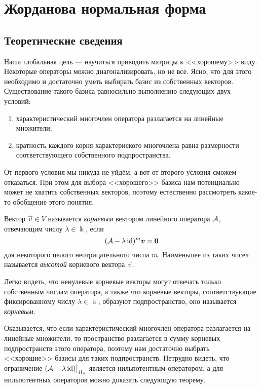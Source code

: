 \section{Жорданова нормальная форма}

\subsection{Теоретические сведения}

Наша глобальная цель --- научиться приводить матрицы к <<хорошему>> виду. Некоторые операторы можно диагонализировать, но не все. Ясно, что для этого необходимо и достаточно уметь выбирать базис из собственных векторов. Существование такого базиса равносильно выполнению следующих двух условий:

\begin{enumerate}[nolistsep, label=(\arabic*)]
	\item характеристический многочлен оператора разлагается на линейные множители;
	\item кратность каждого корня характериского многочлена равна размерности соответствующего собственного подпространства.
\end{enumerate}

От первого условия мы никуда не уйдём, а вот от второго условия сможем отказаться. При этом для выбора <<хорошего>> базиса нам потенциально может не хватить собственных векторов, поэтому естественно рассмотреть какое-то обобщение этого понятия.

\begin{definition}
	Вектор $\vec{v} \in V$ называется \textit{корневым} вектором линейного оператора $\mathcal{A}$, отвечающим числу $\lambda \in \Bbbk$, если
	\[
		(\mathcal{A} - \lambda\operatorname{id})^m\boldsymbol{v} = \boldsymbol{0}
	\]
	для некоторого целого неотрицательного числа $m$. Наименьшее из таких чисел называется \textit{высотой} корневого вектора $\vec{v}$.
\end{definition}

Легко видеть, что ненулевые корневые векторы могут отвечать только собственным числам оператора, а также что корневые векторы, соответствующие фиксированному числу $\lambda \in \Bbbk$, образуют подпространство, оно называется \textit{корневым}.

Оказывается, что если характеристический многочлен оператора разлагается на линейные множители, то пространство разлагается в сумму корневых подпространств этого оператора, поэтому нам достаточно выбрать <<хорошие>> базисы для таких подпространств. Нетрудно видеть, что ограничение $(\mathcal{A} - \lambda\operatorname{id})\big|_{R_\lambda}$ является нильпотентным оператором, а для нильпотентных операторов можно доказать следующую теорему.

